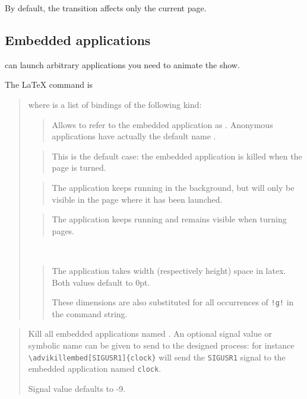 \documentclass[12pt]{article}
\begin{document}
By default, the transition affects only the current page.

\subsection {Embedded applications}

{\ActiveDVI} can launch arbitrary applications you need to animate the
show.

The {\LaTeX} command is 

\medskip\noindent
\docdef \adviembed{} 

\begin{quote}
where  is a list of bindings of the following kind:

\begin{quote}
Allows to refer to the embedded application as . 
Anonymous applications have actually the default name .
\end{quote}


\begin{quote}
This is the default case: the embedded application is killed when the page
is turned.
\end{quote}


\begin{quote}
The application keeps running in the background, but will only be visible in
the page where it has been launched.
\end{quote}

\begin{quote}
The application keeps running and remains visible when turning pages.
\end{quote}

\\
\begin{quote}
The application takes  width (respectively height) space in 
latex. Both values default to 0pt.

These dimensions are also substituted for all occurrences of \verb"!g!" in
the command string. 
\end{quote}

\end{quote}

\medskip\noindent
\docdef \advikillembed {}
\begin{quote}
Kill all embedded applications named .
An optional signal value or symbolic name can be given to send to the
designed process: for instance \verb"\advikillembed[SIGUSR1]{clock}"
will send the \verb"SIGUSR1" signal to the embedded application named
\verb"clock".

Signal value defaults to -9.
\end{quote}
\end{document}
